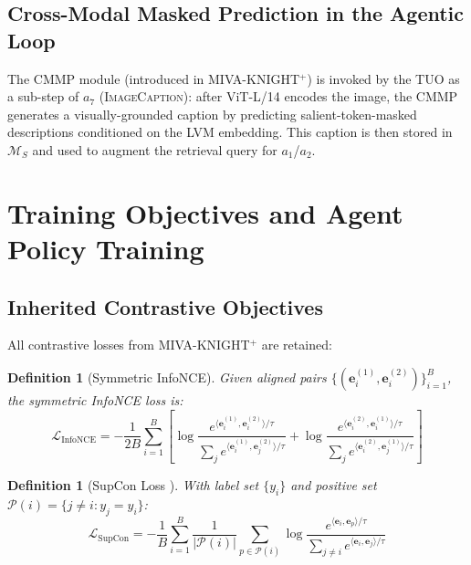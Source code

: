 \documentclass[10pt,conference]{IEEEtran}
\theoremstyle{ieeethm}
\theoremstyle{ieeedef}
\newtheorem{definition}[theorem]{Definition}
\theoremstyle{ieeeremark}
\begin{document}
\subsection{Cross-Modal Masked Prediction in the Agentic Loop}

The CMMP module (introduced in \textsc{MIVA-KNIGHT}$^+$) is invoked by the TUO as a sub-step of $a_7$ (\textsc{ImageCaption}): after ViT-L/14 encodes the image, the CMMP generates a visually-grounded caption by predicting salient-token-masked descriptions conditioned on the LVM embedding. This caption is then stored in $\mathcal{M}_S$ and used to augment the retrieval query for $a_1$/$a_2$.

\section{Training Objectives and Agent Policy Training}
\label{sec:training}

\subsection{Inherited Contrastive Objectives}

All contrastive losses from \textsc{MIVA-KNIGHT}$^+$ are retained:

\begin{definition}[Symmetric InfoNCE]
\label{def:infonce}
Given aligned pairs $\{(\mathbf{e}^{(1)}_i, \mathbf{e}^{(2)}_i)\}_{i=1}^B$, the symmetric InfoNCE loss is:
\begin{equation}
\mathcal{L}_{\text{InfoNCE}} = -\frac{1}{2B}\sum_{i=1}^{B}\left[
  \log\frac{e^{\langle\mathbf{e}^{(1)}_i,\mathbf{e}^{(2)}_i\rangle/\tau}}{\sum_{j} e^{\langle\mathbf{e}^{(1)}_i,\mathbf{e}^{(2)}_j\rangle/\tau}}
+ \log\frac{e^{\langle\mathbf{e}^{(2)}_i,\mathbf{e}^{(1)}_i\rangle/\tau}}{\sum_{j} e^{\langle\mathbf{e}^{(2)}_i,\mathbf{e}^{(1)}_j\rangle/\tau}}
\right]
\label{eq:infonce}
\end{equation}
\end{definition}

\begin{definition}[SupCon Loss \cite{khosla2020supervised}]
\label{def:supcon}
With label set $\{y_i\}$ and positive set $\mathcal{P}(i) = \{j \neq i : y_j = y_i\}$:
\begin{equation}
\mathcal{L}_{\text{SupCon}} = -\frac{1}{B}\sum_{i=1}^{B}
  \frac{1}{|\mathcal{P}(i)|}\sum_{p \in \mathcal{P}(i)}
  \log\frac{e^{\langle\mathbf{e}_i,\mathbf{e}_p\rangle/\tau}}{\sum_{j \neq i} e^{\langle\mathbf{e}_i,\mathbf{e}_j\rangle/\tau}}
\label{eq:supcon}
\end{equation}
\end{definition}
\end{document}
